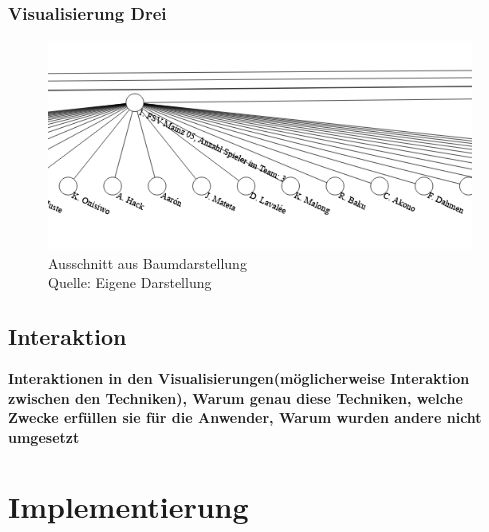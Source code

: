 \documentclass[usegeometry=true]{scrartcl}
\begin{document}
\subsubsection{Visualisierung Drei}
\begin{figure}[h]
\centering
\includegraphics[scale=0.4]{grafiken/BaumDiagram1}
\caption{Ausschnitt aus Baumdarstellung\\ Quelle: Eigene Darstellung}
\end{figure}


\subsection{Interaktion}

\textbf{Interaktionen in den Visualisierungen(möglicherweise Interaktion zwischen den Techniken), Warum genau diese Techniken, welche Zwecke erfüllen sie für die Anwender, Warum wurden andere nicht umgesetzt}

\section{Implementierung}

\end{document}
